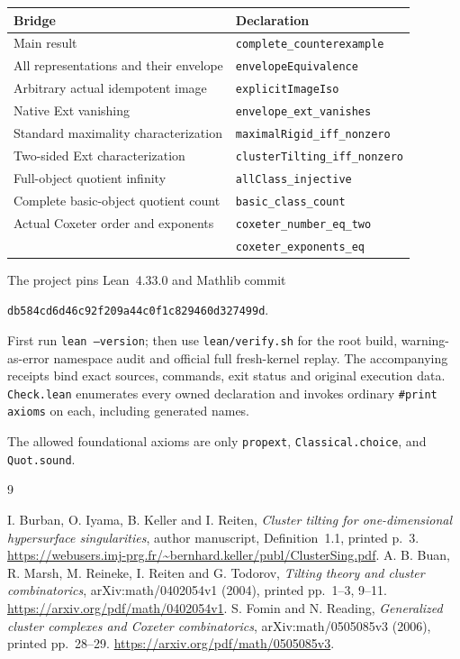 \documentclass[11pt,a4paper]{article}
\begin{document}
\begin{center}
\small
\begin{tabular}{ll}
\toprule
Bridge & Declaration\\
\midrule
Main result & \texttt{complete\_counterexample}\\
All representations and their envelope & \texttt{envelopeEquivalence}\\
Arbitrary actual idempotent image & \texttt{explicitImageIso}\\
Native Ext vanishing & \texttt{envelope\_ext\_vanishes}\\
Standard maximality characterization & \texttt{maximalRigid\_iff\_nonzero}\\
Two-sided Ext characterization & \texttt{clusterTilting\_iff\_nonzero}\\
Full-object quotient infinity & \texttt{allClass\_injective}\\
Complete basic-object quotient count & \texttt{basic\_class\_count}\\
Actual Coxeter order and exponents & \texttt{coxeter\_number\_eq\_two}\\
 & \texttt{coxeter\_exponents\_eq}\\
\bottomrule
\end{tabular}
\end{center}

The project pins Lean~4.33.0 and Mathlib commit\par
\texttt{db584cd6d46c92f209a44c0f1c829460d327499d}.\par
First run \texttt{lean --version}; then use \texttt{lean/verify.sh} for the
root build, warning-as-error namespace audit and official full fresh-kernel replay.
The accompanying receipts bind exact sources, commands, exit status and
original execution data. \texttt{Check.lean} enumerates every owned declaration
and invokes ordinary \texttt{\#print axioms} on each, including generated names.\par
The allowed foundational axioms are only \texttt{propext},
\texttt{Classical.choice}, and \texttt{Quot.sound}.

\begin{thebibliography}{9}
\small\raggedright
{} I. Burban, O. Iyama, B. Keller and I. Reiten,
\emph{Cluster tilting for one-dimensional hypersurface singularities},
author manuscript, Definition~1.1, printed p.~3.
\url{https://webusers.imj-prg.fr/~bernhard.keller/publ/ClusterSing.pdf}.
 A. B. Buan, R. Marsh, M. Reineke, I. Reiten and G. Todorov,
\emph{Tilting theory and cluster combinatorics},
arXiv:math/0402054v1 (2004), printed pp.~1--3, 9--11.
\url{https://arxiv.org/pdf/math/0402054v1}.
 S. Fomin and N. Reading,
\emph{Generalized cluster complexes and Coxeter combinatorics},
arXiv:math/0505085v3 (2006), printed pp.~28--29.
\url{https://arxiv.org/pdf/math/0505085v3}.
\end{thebibliography}
\end{document}
